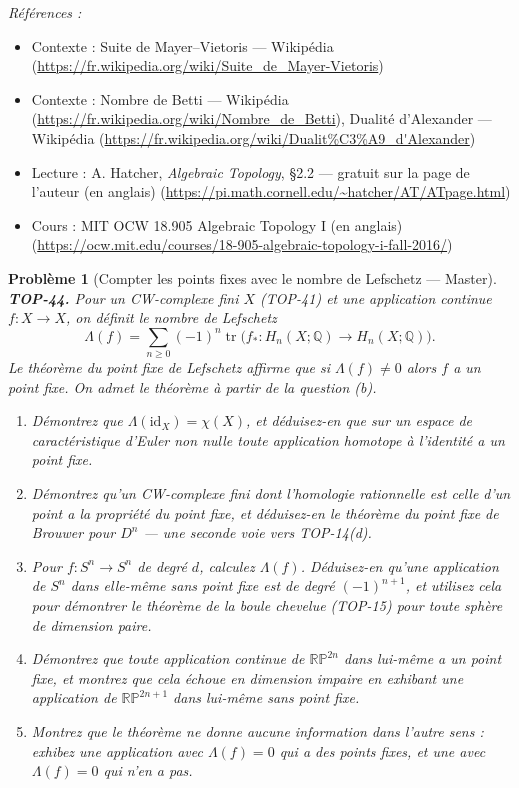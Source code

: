 \documentclass[11pt]{article}
\newtheorem{problem}{Problème}
\newenvironment{refs}{\par\small\noindent\emph{Références :}\begin{itemize}\setlength\itemsep{0pt}}{\end{itemize}\normalsize}
\begin{document}
\begin{refs}
\item Contexte : Suite de Mayer--Vietoris --- Wikipédia (\url{https://fr.wikipedia.org/wiki/Suite_de_Mayer-Vietoris})
\item Contexte : Nombre de Betti --- Wikipédia (\url{https://fr.wikipedia.org/wiki/Nombre_de_Betti}), Dualité d'Alexander --- Wikipédia (\url{https://fr.wikipedia.org/wiki/Dualit%C3%A9_d'Alexander})
\item Lecture : A. Hatcher, \textit{Algebraic Topology}, \S{}2.2 --- gratuit sur la page de l'auteur (en anglais) (\url{https://pi.math.cornell.edu/~hatcher/AT/ATpage.html})
\item Cours : MIT OCW 18.905 Algebraic Topology I (en anglais) (\url{https://ocw.mit.edu/courses/18-905-algebraic-topology-i-fall-2016/})
\end{refs}

\bigskip

\begin{problem}[{Compter les points fixes avec le nombre de Lefschetz --- Master}]
\textbf{TOP-44.} Pour un CW-complexe fini $ X $ (TOP-41) et une application continue
$ f : X \to X $, on définit le nombre de Lefschetz
\[ \Lambda(f) = \sum_{n \ge 0} (-1)^n \operatorname{tr}\Big( f_* : H_n(X;\mathbb{Q}) \to H_n(X;\mathbb{Q}) \Big) . \]
Le théorème du point fixe de Lefschetz affirme que si $ \Lambda(f) \neq 0 $ alors $ f $ a un point
fixe. On admet le théorème à partir de la question (b).
\begin{enumerate}
\item[(a)] Démontrez que $ \Lambda(\mathrm{id}_X) = \chi(X) $, et déduisez-en que sur un espace de
caractéristique d'Euler non nulle toute application homotope à l'identité a un point fixe.
\item[(b)] Démontrez qu'un CW-complexe fini dont l'homologie rationnelle est celle d'un point a la propriété
du point fixe, et déduisez-en le théorème du point fixe de Brouwer pour $ D^n $ --- une seconde voie
vers TOP-14(d).
\item[(c)] Pour $ f : S^n \to S^n $ de degré $ d $, calculez $ \Lambda(f) $. Déduisez-en qu'une
application de $ S^n $ dans elle-même sans point fixe est de degré $ (-1)^{n+1} $, et utilisez cela
pour démontrer le théorème de la boule chevelue (TOP-15) pour toute sphère de dimension paire.
\item[(d)] Démontrez que toute application continue de $ \mathbb{RP}^{2n} $ dans lui-même a un point fixe,
et montrez que cela échoue en dimension impaire en exhibant une application de
$ \mathbb{RP}^{2n+1} $ dans lui-même sans point fixe.
\item[(e)] Montrez que le théorème ne donne aucune information dans l'autre sens : exhibez une application
avec $ \Lambda(f) = 0 $ qui a des points fixes, et une avec $ \Lambda(f) = 0 $ qui n'en a
pas.
\end{enumerate}

\end{problem}
\end{document}
